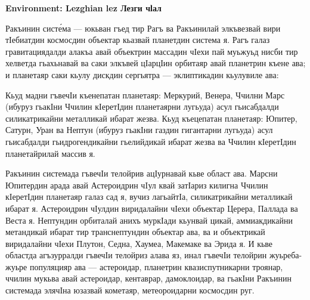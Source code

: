 \documentclass{article}
\begin{document}
\bigskip
{\forig \bfseries Environment: Lezghian lez Лезги чӏал}\par
\begin{cyrtranse}
Ракъинин систе́ма — юкьван гъед тир Рагъ ва Ракъинилай элкъвезвай вири тӀебиатдин космосдин объектар кьазвай планетдин система я. Рагъ галаз гравитациядалди алакъа авай объектрин массадин чӀехи пай муьжуьд нисби тир хелветда гьахьнавай ва саки элкъвей цӀарцӀин орбитаяр авай планетрин къене ава; и планетаяр саки кьулу дискдин сергьятра — эклиптикадин кьулувиле ава:

Кьуд мадни гъвечӀи къенепатан планетаяр: Меркурий, Венера, Ччилни Марс (ибуруз гьакӀни Ччилин кӀеретӀдин планетаярни лугьуда) асул гьисабдалди силикатрикайни металликай ибарат жезва. Кьуд къецепатан планетаяр: Юпитер, Сатурн, Уран ва Нептун (ибуруз гьакӀни газдин гигантарни лугьуда) асул гьисабдалди гьидрогендикайни гьелийдикай ибарат жезва ва Ччилин кӀеретӀдин планетайрилай массив я.

Ракъинин системада гъвечӀи телойрив ацӀурнавай кьве област ава. Марсни Юпитердин арада авай Астероидрин чIул квай затӀариз килигна Ччилин кӀеретӀдин планетаяр галаз сад я, вучиз лагьайтӀа, силикатрикайни металликай ибарат я. Астероидрин чӀулдин виридалайни чӀехи объектар Церера, Паллада ва Веста я. Нептундин орбиталай анихъ муркӀади кьунвай цикай, аммиакдикайни метандикай ибарат тир транснептундин объектар ава, ва и объектрикай виридалайни чӀехи Плутон, Седна, Хаумеа, Макемаке ва Эрида я. И кьве областда агъзурралди гъвечӀи телойриз алава яз, инал гъвечӀи телойрин жуьреба-жуьре популяцияр ава — астероидар, планетрин квазиспутникарни троянар, ччилин мукьва авай астероидар, кентаврар, дамоклоидар, ва гьакӀни Ракъинин системада элячӀна юзазвай кометаяр, метеороидарни космосдин руг. 
\end{cyrtranse}
\end{document}
